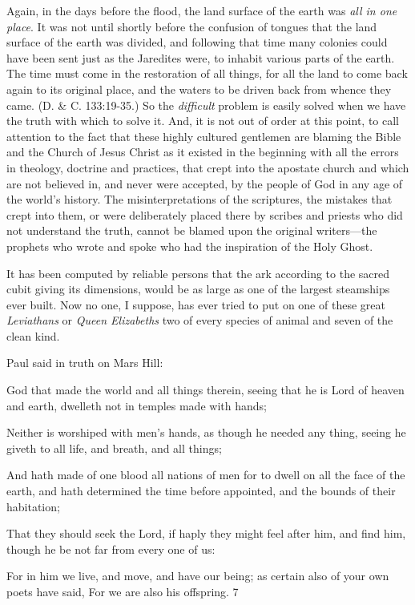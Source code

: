 Again, in the days before the flood, the land surface of the earth was \textit{all in one place}. It was
not until shortly before the confusion of tongues that the land surface of the earth was
divided, and following that time many colonies could have been sent just as the Jaredites
were, to inhabit various parts of the earth. The time must come in the restoration of all things,
for all the land to come back again to its original place, and the waters to be driven back from
whence they came. (D. \& C. 133:19-35.) So the \textit{difficult} problem is easily solved when we
have the truth with which to solve it. And, it is not out of order at this point, to call attention
to the fact that these highly cultured gentlemen are blaming the Bible and the Church of Jesus
Christ as it existed in the beginning with all the errors in theology, doctrine and practices,
that crept into the apostate church and which are not believed in, and never were accepted, by
the people of God in any age of the world's history. The misinterpretations of the scriptures,
the mistakes that crept into them, or were deliberately placed there by scribes and priests who
did not understand the truth, cannot be blamed upon the original writers—the prophets who
wrote and spoke who had the inspiration of the Holy Ghost.

It has been computed by reliable persons that the ark according to the sacred cubit giving its
dimensions, would be as large as one of the largest steamships ever built. Now no one, I
suppose, has ever tried to put on one of these great \textit{Leviathans} or \textit{Queen Elizabeths} two of
every species of animal and seven of the clean kind.

Paul said in truth on Mars Hill:

God that made the world and all things therein, seeing that he is Lord of heaven and earth,
dwelleth not in temples made with hands;

Neither is worshiped with men's hands, as though he needed any thing, seeing he giveth to all
life, and breath, and all things;

And hath made of one blood all nations of men for to dwell on all the face of the earth, and
hath determined the time before appointed, and the bounds of their habitation;

That they should seek the Lord, if haply they might feel after him, and find him, though he be
not far from every one of us:

For in him we live, and move, and have our being; as certain also of your own poets have
said, For we are also his offspring. 7

